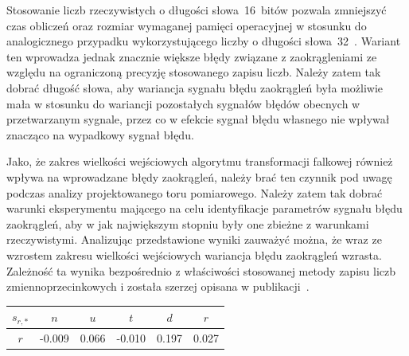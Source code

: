 Stosowanie liczb rzeczywistych o długości słowa~\qty{16}{bitów} pozwala zmniejszyć czas obliczeń oraz rozmiar wymaganej pamięci operacyjnej w stosunku do analogicznego przypadku wykorzystującego liczby o długości słowa~\qty{32}{\bitOw}~\cite{reay_dsp, gcc_manual}. Wariant ten wprowadza jednak znacznie większe błędy związane z zaokrągleniami ze względu na ograniczoną precyzję stosowanego zapisu liczb. Należy zatem tak dobrać długość słowa, aby wariancja sygnału błędu zaokrągleń była możliwie mała w stosunku do wariancji pozostałych sygnałów błędów obecnych w przetwarzanym sygnale, przez co w efekcie sygnał błędu własnego nie wpływał znacząco na wypadkowy sygnał błędu.

Jako, że zakres wielkości wejściowych algorytmu transformacji falkowej również wpływa na wprowadzane błędy zaokrągleń, należy brać ten czynnik pod uwagę podczas analizy projektowanego toru pomiarowego. Należy zatem tak dobrać warunki eksperymentu mającego na celu identyfikacje parametrów sygnału błędu zaokrągleń, aby w jak największym stopniu były one zbieżne z warunkami rzeczywistymi. Analizując przedstawione wyniki zauważyć można, że wraz ze wzrostem zakresu wielkości wejściowych wariancja błędu zaokrągleń wzrasta. Zależność ta wynika bezpośrednio z właściwości stosowanej metody zapisu liczb zmiennoprzecinkowych i została szerzej opisana w publikacji~\cite{benz_floats}.

\begin{table}[htb!]
\begin{center}
\begin{tabular}[c]{| c *{5}{| S[table-format = +1.3] } |} \hline
$s_{r,*}$ & \textbf{$n$} & \textbf{$u$} & \textbf{$t$} & \textbf{$d$} & \textbf{$r$} \\ \hline
$r$       & -0.009       & 0.066        & -0.010       & 0.197        & 0.027        \\ \hline
\end{tabular}
\end{center}
\end{table}

